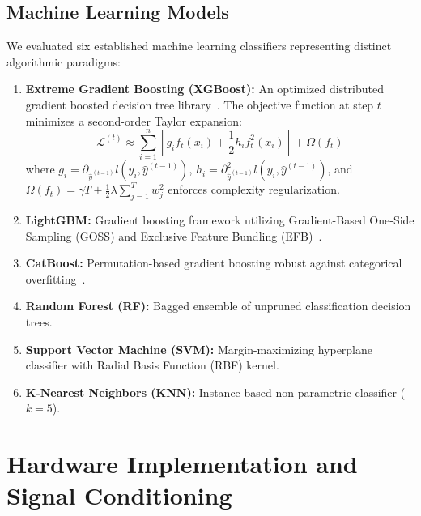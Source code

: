 \documentclass[conference]{IEEEtran}
\begin{document}
\subsection{Machine Learning Models}
We evaluated six established machine learning classifiers representing distinct algorithmic paradigms:
\begin{enumerate}
    \item \textbf{Extreme Gradient Boosting (XGBoost):} An optimized distributed gradient boosted decision tree library~\cite{chen2016xgboost}. The objective function at step $t$ minimizes a second-order Taylor expansion:
    \begin{equation}
    \mathcal{L}^{(t)} \approx \sum_{i=1}^n \left[ g_i f_t(x_i) + \frac{1}{2} h_i f_t^2(x_i) \right] + \Omega(f_t)
    \end{equation}
    where $g_i = \partial_{\hat{y}^{(t-1)}} l(y_i, \hat{y}^{(t-1)})$, $h_i = \partial_{\hat{y}^{(t-1)}}^2 l(y_i, \hat{y}^{(t-1)})$, and $\Omega(f_t) = \gamma T + \frac{1}{2}\lambda \sum_{j=1}^T w_j^2$ enforces complexity regularization.
    \item \textbf{LightGBM:} Gradient boosting framework utilizing Gradient-Based One-Side Sampling (GOSS) and Exclusive Feature Bundling (EFB)~\cite{ke2017lightgbm}.
    \item \textbf{CatBoost:} Permutation-based gradient boosting robust against categorical overfitting~\cite{prokhorenkova2018catboost}.
    \item \textbf{Random Forest (RF):} Bagged ensemble of unpruned classification decision trees.
    \item \textbf{Support Vector Machine (SVM):} Margin-maximizing hyperplane classifier with Radial Basis Function (RBF) kernel.
    \item \textbf{K-Nearest Neighbors (KNN):} Instance-based non-parametric classifier ($k=5$).
\end{enumerate}

\section{Hardware Implementation and Signal Conditioning}
\end{document}

